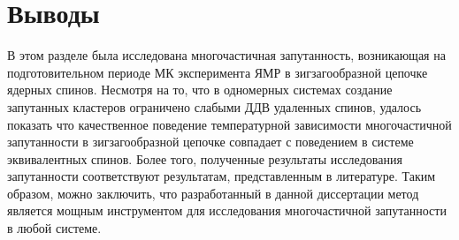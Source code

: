 \section{Выводы}
В этом разделе была исследована многочастичная запутанность,
возникающая на подготовительном периоде МК эксперимента ЯМР
в зигзагообразной цепочке ядерных спинов.
Несмотря на то, что в одномерных системах
создание запутанных кластеров ограничено слабыми ДДВ удаленных спинов,
удалось показать что качественное поведение температурной зависимости многочастичной запутанности
в зигзагообразной цепочке совпадает с поведением в системе эквивалентных спинов.
Более того, полученные результаты исследования запутанности
соответствуют результатам, представленным в литературе.
Таким образом, можно заключить,
что разработанный в данной диссертации метод
является мощным инструментом для исследования многочастичной запутанности в любой системе.
